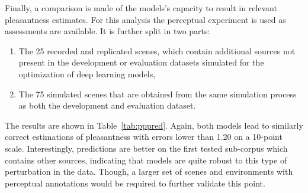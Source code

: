 \documentclass[11pt,a4paper]{article}
\begin{document}
\begin{table}[t]
\centering
\caption{Comparison of performances of models predicting source sound level or presence with metrics at the physical level. Levels and presence metrics are computed for n=8600 1s frames and time of presence metrics on n=200 45s scenes. (TP: true positive, TN: true negative, FP: false positive, FN: false negative)}
\label{tab:perf_cmp}
\end{table}

Finally, a comparison is made of the models's capacity to result in relevant pleasantness estimates. For this analysis the perceptual experiment is used as assessments are available. It is further split in two parts:
\begin{enumerate}
\item The 25 recorded and replicated scenes, which contain additional sources not present in the development or evaluation datasets simulated for the optimization of deep learning models,
\item The 75 simulated scenes that are obtained from the same simulation process as both the development and evaluation dataset.
\end{enumerate}
The results are shown in Table~\ref{tab:pppred}. Again, both models lead to similarly correct estimations of pleasantness with errors lower than 1.20 on a 10-point scale. Interestingly, predictions are better on the first tested sub-corpus which contains other sources, indicating that models are quite robust to this type of perturbation in the data. Though, a larger set of scenes and environments with perceptual annotations would be required to further validate this point.\\
\end{document}
